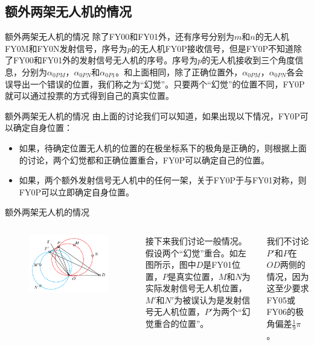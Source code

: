 \documentclass[aspectratio=169]{beamer}
\begin{document}
\subsection{额外两架无人机的情况}

\begin{frame}{额外两架无人机的情况}
    除了FY00和FY01外，还有序号分别为$m$和$n$的无人机FY0M和FY0N发射信号，序号为$p$的无人机FY0P接收信号，但是FY0P不知道除了FY00和FY01外的发射信号无人机的序号。序号为$p$的无人机接收到三个角度信息，分别为$\alpha_{0PM}$，$\alpha_{0PN}$和$\alpha_{0P1}$。和上面相同，除了正确位置外，$\alpha_{0PM}$，$\alpha_{0PN}$各会误导出一个错误的位置，我们称之为“幻觉”。只要两个“幻觉”的位置不同，FY0P就可以通过投票的方式得到自己的真实位置。
\end{frame}

\begin{frame}{额外两架无人机的情况}
    由上面的讨论我们可以知道，如果出现以下情况，FY0P可以确定自身位置：
    \begin{itemize}
        \item 如果，待确定位置无人机的位置的在极坐标系下的极角是正确的，则根据上面的讨论，两个幻觉都和正确位置重合，FY0P可以确定自己的位置。
        \item 如果，两个额外发射信号无人机中的任何一架，关于FY0P于与FY01对称，则FY0P可以立即确定自身位置。
    \end{itemize}
\end{frame}

\begin{frame}{额外两架无人机的情况}
    \begin{columns}
        \begin{figure}[!ht]
            \centering
            \includegraphics[width = \textwidth]{图片/两架无人机情况.pdf}
        \end{figure}

        接下来我们讨论一般情况。假设两个“幻觉”重合。如左图所示，图中$D$是FY01位置，$P$是真实位置，$M$和$N$为实际发射信号无人机位置，$M'$和$N'$为被误认为是发射信号无人机位置，$P'$为两个“幻觉重合的位置”。

        我们不讨论$P'$和$P$在$OD$两侧的情况，因为这至少要求FY05或FY06的极角偏差$\frac{1}{9}\pi$。
    \end{columns}
\end{frame}
\end{document}
